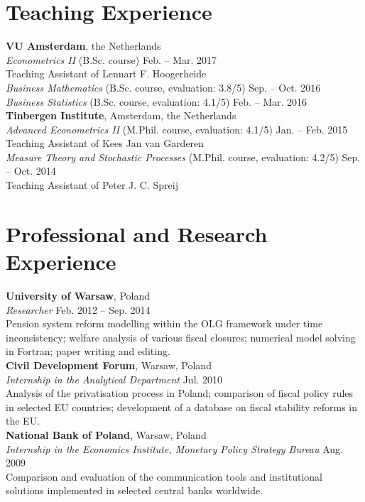 \documentclass[margin,line]{resume}
\begin{document}
\begin{resume}
\vspace{-2mm}


 
 \section{\mysidestyle Teaching Experience}
    \textbf{VU Amsterdam}, the Netherlands \\ 
    \textit{Econometrics II} (B.Sc. course)  \hfill Feb. -- Mar. 2017 \\
    Teaching Assistant of Lennart F. Hoogerheide  \vspace{1mm}\\  	
    \textit{Business Mathematics} (B.Sc. course, evaluation: 3.8/5)  \hfill Sep. -- Oct. 2016 \vspace{1mm}\\ 
    \textit{Business Statistics} (B.Sc. course, evaluation: 4.1/5)  \hfill Feb. -- Mar. 2016 \vspace{1.5mm}\\
   	\textbf{Tinbergen Institute}, Amsterdam, the Netherlands \\
    \textit{Advanced Econometrics II} (M.Phil. course, evaluation: 4.1/5) \hfill Jan. -- Feb. 2015\\
      Teaching Assistant of Kees Jan van Garderen  \vspace{1mm} \\
	\textit{Measure Theory and Stochastic Processes} (M.Phil. course, evaluation: 4.2/5) \hfill Sep. -- Oct. 2014\\
     Teaching Assistant of Peter J. C. Spreij   

    \section{\mysidestyle Professional and Research Experience}
    \textbf{University of Warsaw}, Poland \vspace{0mm}\\
    \textsl{Researcher} \hfill Feb. 2012 -- Sep. 2014\\
Pension system reform modelling within the OLG framework under time inconsistency; welfare analysis of various fiscal closures; numerical model solving in Fortran; paper writing and editing.\vspace{1.5mm} \\
    \textbf{Civil Development Forum}, Warsaw, Poland \\
    \textsl{Internship in the Analytical Department} \hfill Jul. 2010\\
Analysis of the privatisation process in Poland; comparison of fiscal policy rules in selected EU countries; development of a database on fiscal stability reforms in the EU.\vspace{1.5mm} \\
	\textbf{National Bank of Poland}, Warsaw, Poland \\
    \textsl{Internship in the Economics Institute, Monetary Policy Strategy Bureau} \hfill Aug. 2009\\
Comparison and evaluation of the communication tools and institutional solutions implemented in selected central banks worldwide.  


\end{resume}
\end{document}
